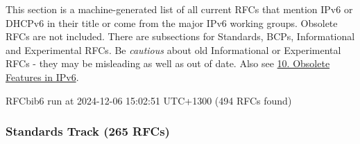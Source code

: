 \documentclass[
]{article}
\begin{document}
This section is a machine-generated list of all current RFCs that
mention IPv6 or DHCPv6 in their title or come from the major IPv6
working groups. Obsolete RFCs are not included. There are subsections
for Standards, BCPs, Informational and Experimental RFCs. Be
\emph{cautious} about old Informational or Experimental RFCs - they may
be misleading as well as out of date. Also see
\hyperref[obsolete-features-in-ipv6]{10. Obsolete Features in IPv6}.

RFCbib6 run at 2024-12-06 15:02:51 UTC+1300 (494 RFCs found)

\subsubsection{Standards Track (265
RFCs)}\label{standards-track-265-rfcs}
\end{document}
